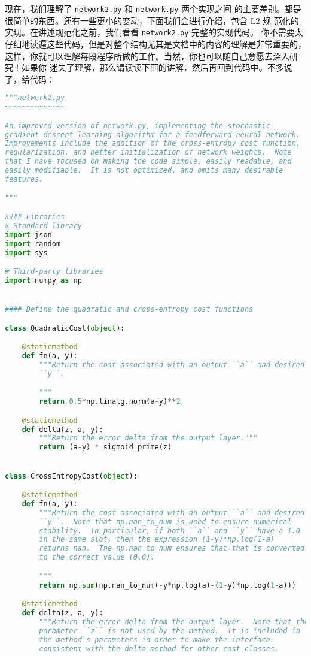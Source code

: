 现在，我们理解了 \lstinline!network2.py! 和 \lstinline!network.py! 两个实现之间
的主要差别。都是很简单的东西。还有一些更小的变动，下面我们会进行介绍，包含 L2 规
范化的实现。在讲述规范化之前，我们看看 \lstinline!network2.py! 完整的实现代码。
你不需要太仔细地读遍这些代码，但是对整个结构尤其是文档中的内容的理解是非常重要的，
这样，你就可以理解每段程序所做的工作。当然，你也可以随自己意愿去深入研究！如果你
迷失了理解，那么请读读下面的讲解，然后再回到代码中。不多说了，给代码：
\begin{lstlisting}[language=Python]
"""network2.py
~~~~~~~~~~~~~~

An improved version of network.py, implementing the stochastic
gradient descent learning algorithm for a feedforward neural network.
Improvements include the addition of the cross-entropy cost function,
regularization, and better initialization of network weights.  Note
that I have focused on making the code simple, easily readable, and
easily modifiable.  It is not optimized, and omits many desirable
features.

"""

#### Libraries
# Standard library
import json
import random
import sys

# Third-party libraries
import numpy as np


#### Define the quadratic and cross-entropy cost functions

class QuadraticCost(object):

    @staticmethod
    def fn(a, y):
        """Return the cost associated with an output ``a`` and desired output
        ``y``.

        """
        return 0.5*np.linalg.norm(a-y)**2

    @staticmethod
    def delta(z, a, y):
        """Return the error delta from the output layer."""
        return (a-y) * sigmoid_prime(z)


class CrossEntropyCost(object):

    @staticmethod
    def fn(a, y):
        """Return the cost associated with an output ``a`` and desired output
        ``y``.  Note that np.nan_to_num is used to ensure numerical
        stability.  In particular, if both ``a`` and ``y`` have a 1.0
        in the same slot, then the expression (1-y)*np.log(1-a)
        returns nan.  The np.nan_to_num ensures that that is converted
        to the correct value (0.0).

        """
        return np.sum(np.nan_to_num(-y*np.log(a)-(1-y)*np.log(1-a)))

    @staticmethod
    def delta(z, a, y):
        """Return the error delta from the output layer.  Note that the
        parameter ``z`` is not used by the method.  It is included in
        the method's parameters in order to make the interface
        consistent with the delta method for other cost classes.


\end{lstlisting}
